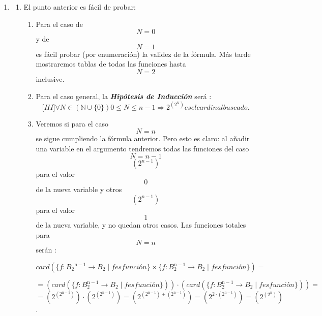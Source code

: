 \begin{enumerate}
\def\labelenumi{\arabic{enumi}.}
\setcounter{enumi}{6}
\item
  \begin{enumerate}
  \def\labelenumii{\arabic{enumii}.}
  \item
    El punto anterior es fácil de probar:

    \begin{enumerate}
    \def\labelenumiii{\arabic{enumiii}.}
    \item
      Para el caso de \[N = 0\] y de \[N = 1\] es fácil probar (por
      enumeración) la vali\-dez de la fórmula. Más tarde mostraremos
      tablas de todas las funciones hasta \[N = 2\] inclusive.
    \item
      Para el caso general, la \emph{\textbf{Hipótesis de Inducción}}
      será
      :\[{\lbrack\mathbf{\mathit{HI}}\rbrack}\forall{N \in {({\mathbb{N} \cup {\{ 0\}}})}}{{0 \leq N} \leq {n - 1}}\Rightarrow 2^{(2^{\mathbf{\mathrm{N}}})}\mathit{es}\mathit{el}\mathit{cardinal}\mathit{buscado.}\]
    \item
      Veremos si para el caso \[N = n\] se sigue cumpliendo la fórmula
      anterior. Pero esto es claro: al añadir una variable en el
      argumento tendremos todas las funcio\-nes del caso \[N = {n - 1}\]
      \[(2^{n - 1})\] para el valor \[0\] de la nueva variable y otros
      \[(2^{n - 1})\] para el valor \[1\] de la nueva variable, y no
      quedan otros casos. Las funciones totales para \[N = n\] serán :

      \[\mathit{card}{{({{\{{f:{{B_{\mathbf{\mathrm{2}}}}^{\mathbf{\mathrm{n - 1}}}\rightarrow B_{\mathbf{\mathrm{2}}}}{\mid}f\mathit{es}\mathit{función}}\}} \times {\{{f:{B_{\mathbf{\mathrm{2}}}^{\mathbf{\mathrm{n - 1}}}\rightarrow B_{\mathbf{\mathrm{2}}}}{\mid}f\mathit{es}\mathit{función}}\}}})} =}\]

      \[{= {{({\mathit{card}{({\{{f:{B_{\mathbf{\mathrm{2}}}^{\mathbf{\mathrm{n - 1}}}\rightarrow B_{\mathbf{\mathrm{2}}}}{\mid}f\mathit{es}\mathit{función}}\}})}})} \cdot {({\mathit{card}{({\{{f:{B_{\mathbf{\mathrm{2}}}^{\mathbf{\mathrm{n - 1}}}\rightarrow B_{\mathbf{\mathrm{2}}}}{\mid}f\mathit{es}\mathit{función}}\}})}})}}} =\]
      \[{{{= {{(2^{(2^{\mathbf{\mathrm{n - 1}}})})} \cdot {(2^{(2^{\mathbf{\mathrm{n - 1}}})})}}} = {(2^{{(2^{\mathbf{\mathrm{n - 1}}})} + {(2^{\mathbf{\mathrm{n - 1}}})}})}} = {(2^{2 \cdot {(2^{\mathbf{\mathrm{n - 1}}})}})}} = {(2^{(2^{\mathbf{\mathrm{n}}})})}\].


\end{enumerate}
\end{enumerate}
\end{enumerate}
